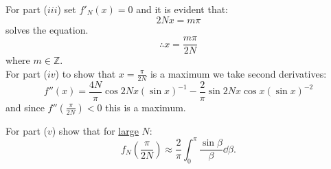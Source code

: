\begin{enumerate}
    For part ($iii$) set $f'_N(x)=0$ and it is evident that:
    $$2Nx=m\pi$$
    solves the equation.
    $$\therefore x=\frac{m\pi}{2N}$$
    where $m\in\mathbb{Z}$. \\

    For part ($iv$) to show that $x=\displaystyle\frac{\pi}{2N}$
    is a maximum we take second derivatives:
    $$f''(x)=\frac{4N}{\pi}\cos2Nx(\sin x)^{-1}
    -\frac{2}{\pi}\sin 2Nx\cos x (\sin x)^{-2}$$
    and since $f''(\frac{\pi}{2N})<0$ this is a maximum.

    \newpage

    For part ($v$) show that for \underline{large} $N$:
    $$f_N(\frac{\pi}{2N})\approx\frac{2}{\pi}\int_{0}^{\pi}
    \frac{\sin\beta}{\beta}\dd\beta.$$

\end{enumerate}